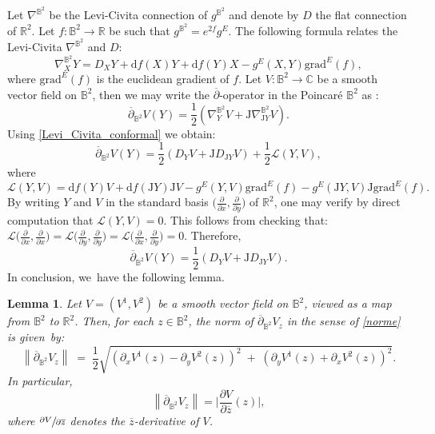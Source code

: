 \documentclass[11pt]{article}
\theoremstyle{plain}
\newtheorem{lemma}[cor]{Lemma}
\theoremstyle{definition}
\newcommand{\J}{\mathrm{J}}
\begin{document}
Let $\nabla^{\mathbb{B}^2}$ be the Levi-Civita connection of $g^{\mathbb{B}^2}$ and denote by $D$ the flat connection of $\mathbb{R}^2$. Let $f:\mathbb{B}^2\to\mathbb{R}$ be such that $g^{\mathbb{B}^2}=e^{2f}g^E$. The following formula relates the Levi-Civita $\nabla^{\mathbb{B}^2}$ and $D$:
\begin{equation}\label{Levi_Civita_conformal}
\nabla^{\mathbb{B}^2}_XY=D_XY+\mathrm{d}f(X)Y+\mathrm{d}f(Y)X-g^E(X,Y)\mathrm{grad}^E(f),
\end{equation}
where $\mathrm{grad}^E(f)$ is the euclidean gradient of $f$. Let $V:\mathbb{B}^2\to\mathbb{C}$ be a smooth vector field on $\mathbb{B}^2$, then we may write the $\overline{\partial}$-operator in the Poincaré $\mathbb{B}^2$ as :
\begin{equation}\label{dbar_B2}
\overline{\partial}_{\mathbb{B}^2}V(Y)=\frac{1}{2}(\nabla^{\mathbb{B}^2}_YV+\J\nabla^{\mathbb{B}^2}_{\J Y}V).
\end{equation}
Using \eqref{Levi_Civita_conformal} we obtain:
\begin{equation}\label{eq_53}
\overline{\partial}_{\mathbb{B}^2}V(Y)=\frac{1}{2} (D_YV+\J D_{\J Y}V)+\frac{1}{2} \mathcal{L}(Y,V),
\end{equation}
where
\[
\mathcal{L}(Y,V)=\mathrm{d}f(Y)V+ \mathrm{d}f(\J Y)\J V-g^{E}(Y,V)\mathrm{grad}^E(f)-g^{E}(\J Y,V)\J\mathrm{grad}^E(f).
\]
By writing \(Y \) and \(V \) in the standard basis \(\bigl(\frac{\partial}{\partial x}, \frac{\partial}{\partial y}\bigr) \) of \(\mathbb{R}^2 \), one may verify by direct computation that \(\mathcal{L}(Y, V) = 0 \). This follows from checking that:
$
\mathcal{L}\bigl(\frac{\partial}{\partial x}, \frac{\partial}{\partial x} \bigr)
= \mathcal{L}\bigl(\frac{\partial}{\partial y}, \frac{\partial}{\partial y} \bigr)
= \mathcal{L}\bigl(\frac{\partial}{\partial x}, \frac{\partial}{\partial y} \bigr)
= 0
$.
Therefore,
\begin{equation}\label{dbar_relation0}
\overline{\partial}_{\mathbb{B}^2}V(Y)=\frac{1}{2}(D_YV + \mathrm{J} D_{\mathrm{J}Y}V).
\end{equation}
In conclusion, we~have the following lemma.

\begin{lemma}\label{same_d_bar}
Let \(V = (V^1, V^2) \) be a smooth vector field on \(\mathbb{B}^2 \), viewed as a map from \(\mathbb{B}^2 \) to \(\mathbb{R}^2 \). Then, for each \(z \!\in\! \mathbb{B}^2 \), the norm of \(\overline{\partial}_{\mathbb{B}^2}V_z \) in the sense of \eqref{norme} is given~by:
\[
\left\lVert\overline\partial_{\mathbb{B}^2}V_z\right\rVert
\;=\;
\frac{1}{2}
\sqrt{
\left(\partial_x V^1(z) - \partial_y V^2(z)\right)^2
\;+\;
\left(\partial_y V^1(z) + \partial_x V^2(z)\right)^2
}.
\]
In particular,
\begin{equation}\label{norme2}
\left\lVert \overline{\partial}_{\mathbb{B}^2} V_z \right\rVert = \biggl| \frac{\partial V}{\partial \overline{z}}(z) \biggr|,
\end{equation}
where \(\sfrac{\partial V}{\partial \overline{z}} \) denotes the \(\overline{z} \)-derivative of \(V \).
\end{lemma}
\end{document}
